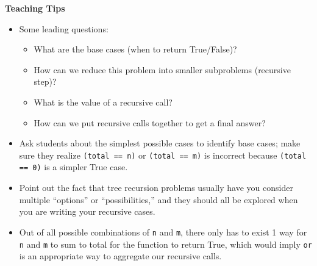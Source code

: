 \begin{blocksection}
\begin{guide}
\textbf{Teaching Tips}
\begin{itemize}
    \item Some leading questions:
    \begin{itemize}
        \item What are the base cases (when to return True/False)?
        \item How can we reduce this problem into smaller subproblems (recursive step)?
        \item What is the value of a recursive call?
        \item How can we put recursive calls together to get a final answer?
    \end{itemize}
    \item Ask students about the simplest possible cases to identify base cases; make sure they realize \lstinline{(total == n)} or \lstinline{(total == m)}  is incorrect because \lstinline{(total == 0)} is a simpler True case.
    \item Point out the fact that tree recursion problems usually have you consider multiple “options” or “possibilities,” and they should all be explored when you are writing your recursive cases.
    \item Out of all possible combinations of \lstinline{n} and \lstinline{m}, there only has to exist 1 way for \lstinline{n} and \lstinline{m} to sum to total for the function to return True, which would imply \lstinline{or} is an appropriate way to aggregate our recursive calls.
\end{itemize}
\end{guide}
\end{blocksection}
